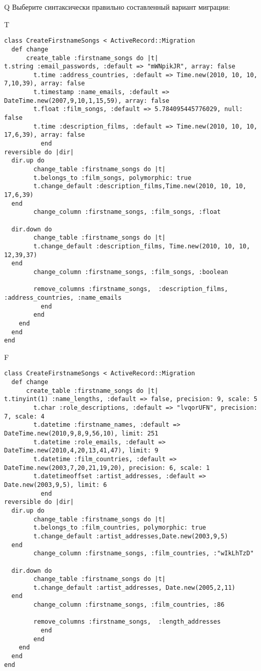 Q
Выберите синтаксически правильно составленный вариант миграции:

T
\begin{verbatim}
class CreateFirstnameSongs < ActiveRecord::Migration
  def change
	  create_table :firstname_songs do |t|
t.string :email_passwords, :default => "mWNpikJR", array: false
		t.time :address_countries, :default => Time.new(2010, 10, 10, 7,10,39), array: false
		t.timestamp :name_emails, :default => DateTime.new(2007,9,10,1,15,59), array: false
		t.float :film_songs, :default => 5.784095445776029, null: false
		t.time :description_films, :default => Time.new(2010, 10, 10, 17,6,39), array: false
		  end
reversible do |dir|
  dir.up do
		change_table :firstname_songs do |t|
		t.belongs_to :film_songs, polymorphic: true
 		t.change_default :description_films,Time.new(2010, 10, 10, 17,6,39)
  end
 		change_column :firstname_songs, :film_songs, :float
   
  dir.down do
		change_table :firstname_songs do |t|
		t.change_default :description_films, Time.new(2010, 10, 10, 12,39,37)
  end
 		change_column :firstname_songs, :film_songs, :boolean
   
		remove_columns :firstname_songs,  :description_films, :address_countries, :name_emails 
	      end
	    end
    end 
  end
end

\end{verbatim}

F
\begin{verbatim}
class CreateFirstnameSongs < ActiveRecord::Migration
  def change
	  create_table :firstname_songs do |t|
t.tinyint(1) :name_lengths, :default => false, precision: 9, scale: 5
		t.char :role_descriptions, :default => "lvqorUFN", precision: 7, scale: 4
		t.datetime :firstname_names, :default => DateTime.new(2010,9,8,9,56,10), limit: 251
		t.datetime :role_emails, :default => DateTime.new(2010,4,20,13,41,47), limit: 9
		t.datetime :film_countries, :default => DateTime.new(2003,7,20,21,19,20), precision: 6, scale: 1
		t.datetimeoffset :artist_addresses, :default => Date.new(2003,9,5), limit: 6
		  end
reversible do |dir|
  dir.up do
		change_table :firstname_songs do |t|
		t.belongs_to :film_countries, polymorphic: true
 		t.change_default :artist_addresses,Date.new(2003,9,5)
  end
 		change_column :firstname_songs, :film_countries, :"wIkLhTzD"
   
  dir.down do
		change_table :firstname_songs do |t|
		t.change_default :artist_addresses, Date.new(2005,2,11)
  end
 		change_column :firstname_songs, :film_countries, :86
   
		remove_columns :firstname_songs,  :length_addresses 
	      end
	    end
    end 
  end
end

\end{verbatim}

